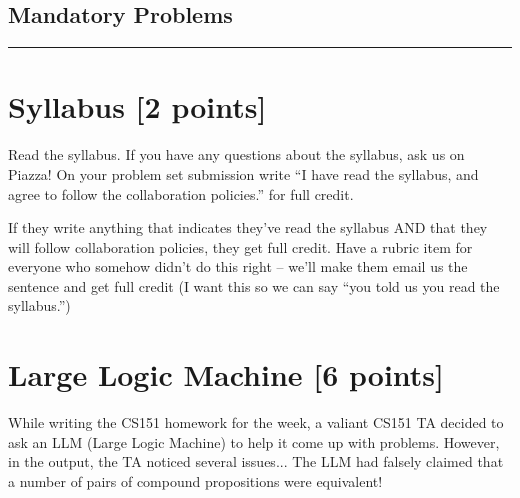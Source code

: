 \documentclass[homework, problems]{../../latex-common/cs151-common}
\begin{document}
\maketitle

\begin{problemsonly}
\begin{center}
\section*{\hfill \huge Mandatory Problems \hfill}
\end{center}

\vspace{-3mm}
\rule{\textwidth}{1pt}
\vspace{-5mm}
\end{problemsonly}

 \section{Syllabus \hfill [2 points]}
\begin{problemsonly}
    
Read the syllabus. If you have any questions about the syllabus, ask us on Piazza! 
On your problem set submission write ``I have read the syllabus, and agree to follow the collaboration policies.'' for full credit.

\end{problemsonly}
\begin{rubric}
    If they write anything that indicates they've read the syllabus AND that they will follow collaboration policies, they get full credit. 
    Have a rubric item for everyone who somehow didn't do this right -- we'll make them email us the sentence and get full credit (I want this so we can say ``you told us you read the syllabus.'')
\end{rubric}

\section{Large Logic Machine \hfill [6 points]} 
\begin{problemsonly}
While writing the CS151 homework for the week, a valiant CS151 TA decided to ask an LLM (Large Logic Machine) to help it come up with problems. However, in the output, the TA noticed several issues... The LLM had falsely claimed that a number of pairs of compound propositions were equivalent!
\end{problemsonly}
\end{document}
